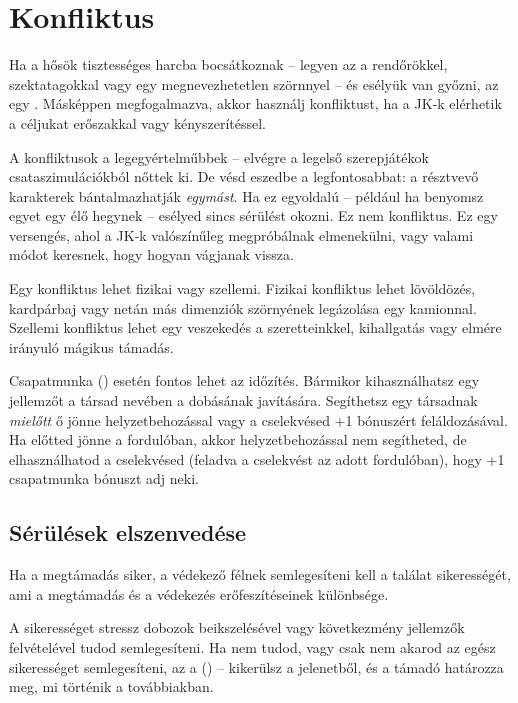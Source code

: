 \section{Konfliktus}

Ha a hősök tisztességes harcba bocsátkoznak – legyen az a rendőrökkel, szektatagokkal vagy egy megnevezhetetlen szörnnyel – és esélyük van győzni, az egy . Másképpen megfogalmazva, akkor használj konfliktust, ha a JK‑k elérhetik a céljukat erőszakkal vagy kényszerítéssel.

A konfliktusok a legegyértelműbbek – elvégre a legelső szerepjátékok csataszimulációkból nőttek ki. De vésd eszedbe a legfontosabbat: a résztvevő karakterek bántalmazhatják \emph{egymást}. Ha ez egyoldalú – például ha benyomsz egyet egy élő hegynek – esélyed sincs sérülést okozni. Ez nem konfliktus. Ez egy versengés, ahol a JK‑k valószínűleg megpróbálnak elmenekülni, vagy valami módot keresnek, hogy hogyan vágjanak vissza.

Egy konfliktus lehet fizikai vagy szellemi. Fizikai konfliktus lehet lövöldözés, kardpárbaj vagy netán más dimenziók szörnyének legázolása egy kamionnal. Szellemi konfliktus lehet egy veszekedés a szeretteinkkel, kihallgatás vagy elmére irányuló mágikus támadás.

Csapatmunka () esetén fontos lehet az időzítés. Bármikor kihasználhatsz egy jellemzőt a társad nevében a dobásának javítására. Segíthetsz egy társadnak \emph{mielőtt} ő jönne helyzetbehozással vagy a cselekvésed +1 bónuszért feláldozásával. Ha előtted jönne a fordulóban, akkor helyzetbehozással nem segítheted, de elhasználhatod a cselekvésed (feladva a cselekvést az adott fordulóban), hogy +1 csapatmunka bónuszt adj neki.

\subsection{Sérülések elszenvedése}

Ha a megtámadás siker, a védekező félnek semlegesíteni kell a találat sikerességét, ami a megtámadás és a védekezés erőfeszítéseinek különbsége.

A sikerességet stressz dobozok beikszelésével vagy következmény jellemzők felvételével tudod semlegesíteni. Ha nem tudod, vagy csak nem akarod az egész sikerességet semlegesíteni, az a  () – kikerülsz a jelenetből, és a támadó határozza meg, mi történik a továbbiakban.

